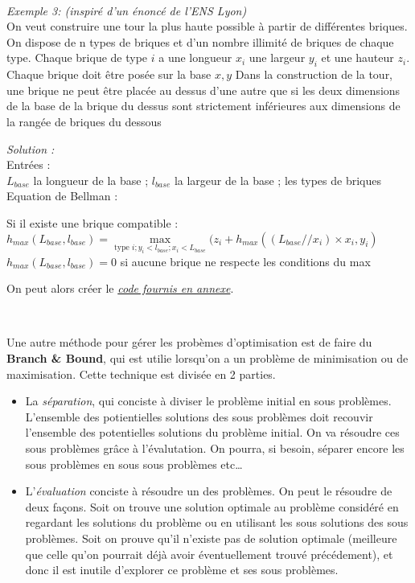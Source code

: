 \documentclass[
  paper=a4,
  ,captions=tableheading
]{scrartcl}
\providecommand{\tightlist}{%
  \setlength{\itemsep}{0pt}\setlength{\parskip}{0pt}}
\begin{document}
~\\
\hspace*{0.333em}

\emph{Exemple 3: (inspiré d'un énoncé de l'ENS Lyon)}\\
On veut construire une tour la plus haute possible à partir de
différentes briques. On dispose de n types de briques et d'un nombre
illimité de briques de chaque type. Chaque brique de type \(i\) a une
longueur \(x_i\) une largeur \(y_i\) et une hauteur \(z_i\). Chaque
brique doit être posée sur la base \(x,y\) Dans la construction de la
tour, une brique ne peut être placée au dessus d'une autre que si les
deux dimensions de la base de la brique du dessus sont strictement
inférieures aux dimensions de la rangée de briques du dessous

\emph{Solution :}\\
Entrées :\\
\(L_{base}\) la longueur de la base ; \(l_{base}\) la largeur de la base
; les types de briques\\
Equation de Bellman :

Si il existe une brique compatible :\\
\(h_{max}(L_{base}, l_{base}) = \underset{\textrm{type } i ; y_i < l_{base} ; x_i < L_{base}} {\max}( z_i + h_{max}( (L_{base}//x_i ) \times x_i, y_i)\)\\
\(h_{max}(L_{base}, l_{base}) = 0\) si aucune brique ne respecte les
conditions du max

On peut alors créer le \protect\hyperlink{exemple3}{\emph{code fournis
en annexe}}.

~

Une autre méthode pour gérer les probèmes d'optimisation est de faire du
\textbf{Branch \& Bound}, qui est utilie lorsqu'on a un problème de
minimisation ou de maximisation. Cette technique est divisée en 2
parties.

\begin{itemize}
\tightlist
\item
  La \emph{séparation}, qui conciste à diviser le problème initial en
  sous problèmes. L'ensemble des potientielles solutions des sous
  problèmes doit recouvir l'ensemble des potentielles solutions du
  problème initial. On va résoudre ces sous problèmes grâce à
  l'évalutation. On pourra, si besoin, séparer encore les sous problèmes
  en sous sous problèmes etc\ldots{}
\item
  L'\emph{évaluation} conciste à résoudre un des problèmes. On peut le
  résoudre de deux façons. Soit on trouve une solution optimale au
  problème considéré en regardant les solutions du problème ou en
  utilisant les sous solutions des sous problèmes. Soit on prouve qu'il
  n'existe pas de solution optimale (meilleure que celle qu'on pourrait
  déjà avoir éventuellement trouvé précédement), et donc il est inutile
  d'explorer ce problème et ses sous problèmes.
\end{itemize}
\end{document}
